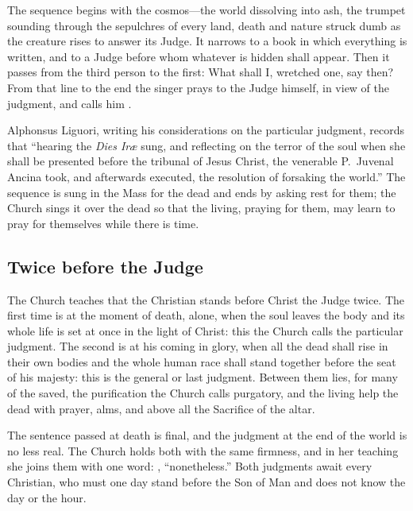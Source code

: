 The sequence begins with the cosmos---the world dissolving into ash, the trumpet sounding through the sepulchres of every land, death and nature struck dumb as the creature rises to answer its Judge. It narrows to a book in which everything is written, and to a Judge before whom whatever is hidden shall appear. Then it passes from the third person to the first:  What shall I, wretched one, say then? From that line to the end the singer prays to the Judge himself, in view of the judgment, and calls him .

Alphonsus Liguori, writing his considerations on the particular judgment, records that ``hearing the \emph{Dies Ir\ae} sung, and reflecting on the terror of the soul when she shall be presented before the tribunal of Jesus Christ, the venerable P.~Juvenal Ancina took, and afterwards executed, the resolution of forsaking the world.'' The sequence is sung in the Mass for the dead and ends by asking rest for them; the Church sings it over the dead so that the living, praying for them, may learn to pray for themselves while there is time.

\subsection{Twice before the Judge}

The Church teaches that the Christian stands before Christ the Judge twice. The first time is at the moment of death, alone, when the soul leaves the body and its whole life is set at once in the light of Christ: this the Church calls the particular judgment. The second is at his coming in glory, when all the dead shall rise in their own bodies and the whole human race shall stand together before the seat of his majesty: this is the general or last judgment. Between them lies, for many of the saved, the purification the Church calls purgatory, and the living help the dead with prayer, alms, and above all the Sacrifice of the altar.

The sentence passed at death is final, and the judgment at the end of the world is no less real. The Church holds both with the same firmness, and in her teaching she joins them with one word: , ``nonetheless.'' Both judgments await every Christian, who must one day stand before the Son of Man and does not know the day or the hour.
